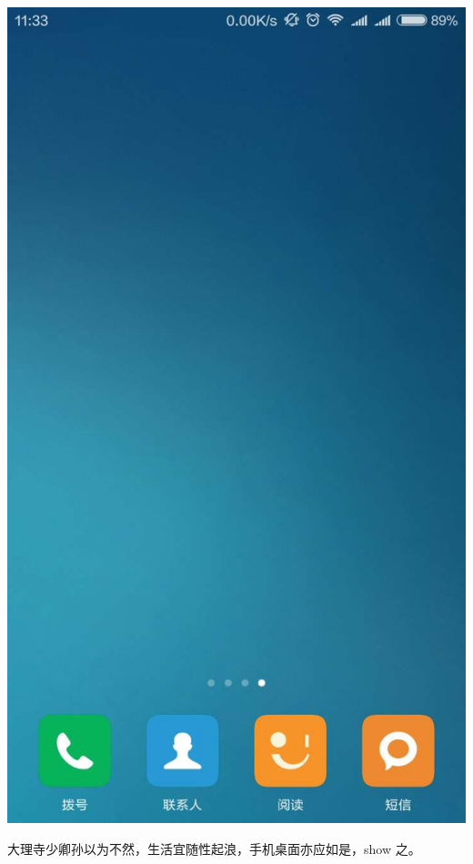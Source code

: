 \documentclass[12pt, a4paper]{book}
\begin{document}
\begin{CJK}{UTF8}{gbsn}
    \includegraphics[height=0.3\textheight]{./figure/desktop-3.jpg}

    大理寺少卿孙以为不然，生活宜随性起浪，手机桌面亦应如是，show 之。


\end{CJK}
\end{document}
